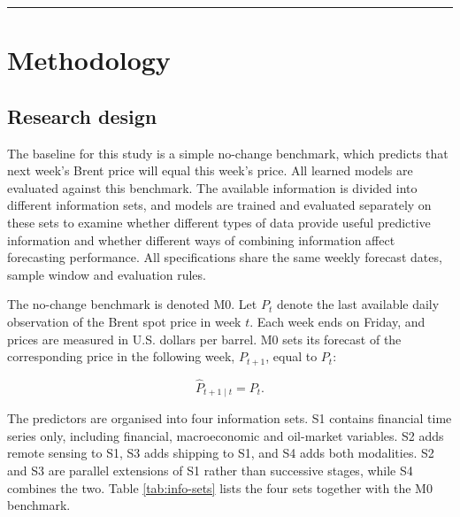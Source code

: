 \documentclass[
  british,
  12pt,
  oneside]{book}
\begin{document}
\begin{center}\rule{0.5\linewidth}{0.5pt}\end{center}

\chapter{Methodology}\label{method}

\section{Research design}\label{method-design}

The baseline for this study is a simple no-change benchmark, which predicts that next week's Brent price will equal this week's price. All learned models are evaluated against this benchmark. The available information is divided into different information sets, and models are trained and evaluated separately on these sets to examine whether different types of data provide useful predictive information and whether different ways of combining information affect forecasting performance. All specifications share the same weekly forecast dates, sample window and evaluation rules.

The no-change benchmark is denoted M0. Let \(P_t\) denote the last available daily observation of the Brent spot price in week \(t\). Each week ends on Friday, and prices are measured in U.S. dollars per barrel. M0 sets its forecast of the corresponding price in the following week, \(P_{t+1}\), equal to \(P_t\):

\begin{equation}
\hat{P}_{t+1\mid t}=P_t.
\label{eq:m0}
\end{equation}

The predictors are organised into four information sets. S1 contains financial time series only, including financial, macroeconomic and oil-market variables. S2 adds remote sensing to S1, S3 adds shipping to S1, and S4 adds both modalities. S2 and S3 are parallel extensions of S1 rather than successive stages, while S4 combines the two. Table \ref{tab:info-sets} lists the four sets together with the M0 benchmark.
\end{document}
